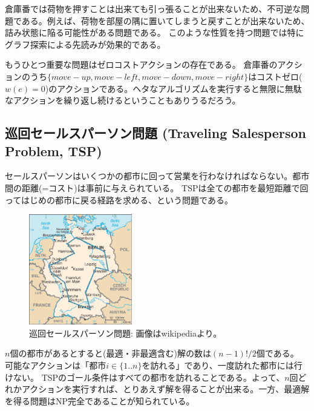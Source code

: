 \documentclass[b5paper]{report}
\begin{document}
倉庫番では荷物を押すことは出来ても引っ張ることが出来ないため、不可逆な問題である。例えば、荷物を部屋の隅に置いてしまうと戻すことが出来ないため、詰み状態に陥る可能性がある問題である。
このような性質を持つ問題では特にグラフ探索による先読みが効果的である。

もうひとつ重要な問題はゼロコストアクションの存在である。%
倉庫番のアクションのうち$\{move-up,move-left,move-down,move-right\}$はコストゼロ($w(e)=0$)のアクションである。ヘタなアルゴリズムを実行すると無限に無駄なアクションを繰り返し続けるということもありうるだろう。



\subsection{巡回セールスパーソン問題 (Traveling Salesperson Problem, TSP)}

セールスパーソンはいくつかの都市に回って営業を行わなければならない。都市間の距離(=コスト)は事前に与えられている。
TSPは全ての都市を最短距離で回ってはじめの都市に戻る経路を求める、という問題である\cite{applegate2006traveling}。

\begin{figure}
\centering
\includegraphics[bb=0 0 328 352,width=0.4\textwidth]{figures/tsp.eps}%
\caption{巡回セールスパーソン問題: 画像はwikipediaより。}
\label{fig:sokoban}
\end{figure}

$n$個の都市があるとすると(最適・非最適含む)解の数は$(n-1)!/2$個である。
可能なアクションは「都市$i \in \{1..n\}$を訪れる」であり、一度訪れた都市には行けない。
TSPのゴール条件はすべての都市を訪れることである。よって、$n$回どれかアクションを実行すれば、とりあえず解を得ることが出来る。一方、最適解を得る問題はNP完全であることが知られている。
\end{document}
